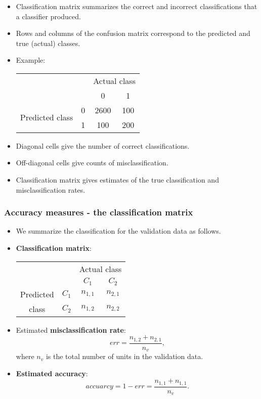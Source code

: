 \documentclass[compress]{beamer}
\begin{document}
\begin{frame}
	\frametitle{}
	\begin{itemize}
  \item Classification matrix summarizes the correct and incorrect classifications
that a classifier produced.
  \item Rows and columns
of the confusion matrix correspond to the predicted and true (actual) classes.
\item Example:\\[-2mm]
\begin{tabular}{cccc}

 &  & \multicolumn{2}{|l}{Actual class} \\
  & & \multicolumn{1}{|c}{0} & 1 \\\hline
\multirow{2}{*}{Predicted class} & 0 & \multicolumn{1}{|c}{2600} & 100 \\
 & 1 & \multicolumn{1}{|c}{100} & 200 \\
\end{tabular}
\item Diagonal cells give the number of
correct classifications.
\item Off-diagonal cells give counts of misclassification.
\item Classification matrix gives estimates of the true classification and misclassification
rates.
\end{itemize}
\end{frame}



\begin{frame}
\frametitle{Accuracy measures - the classification matrix}
\begin{itemize}
\item We summarize the classification for the validation data as follows.
\item \textbf{Classification matrix}:\\[-2mm]
\begin{center}
\begin{tabular}{cccc}

 &  & \multicolumn{2}{|l}{Actual class} \\
  & & \multicolumn{1}{|c}{$C_1$} & $C_2$ \\\hline
\multirow{1}{*}{Predicted} & $C_1$ & \multicolumn{1}{|c}{$n_{1,1}$} & $n_{2,1}$\\
class & $C_2$ & \multicolumn{1}{|c}{$n_{1,2}$} & $n_{2,2}$ \\
\end{tabular}
\end{center}
\item Estimated \textbf{misclassification rate}: $$err=\frac{n_{1,2}+n_{2,1}}{n_v},$$ where $n_v$ is the total number of units in the validation data.
\item \textbf{Estimated accuracy}: $$accuarcy = 1- err=\frac{n_{1,1}+n_{1,1}}{n_v}.$$
\end{itemize}
\end{frame}
\end{document}
